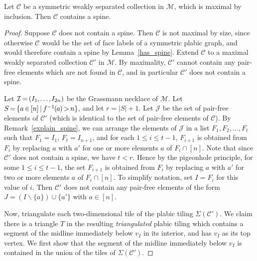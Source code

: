 \documentclass[ALCO,ThmDefs,Unicode,epreuves]{cedram}
\newcommand*{\mk}{\mkern -1mu}
\newcommand*{\Mk}{\mkern -2mu}
\begin{document}
\begin{lemm}\label{spine}Let $\mathcal{C}$ be a symmetric weakly separated collection in $\mathcal{M}$, which is maximal by inclusion. Then $\mathcal{C}$ contains a spine.
\end{lemm}

\begin{proof}
Suppose $\mathcal{C}$ does not contain a spine. Then $\mathcal{C}$ is not maximal by size, since otherwise $\mathcal{C}$ would be the set of face labels of a symmetric plabic graph, and would therefore contain a spine by Lemma~\ref{has_spine}. Extend $\mathcal{C}$ to a maximal weakly separated collection $\mathcal{C}'$ in $\mathcal{M}$. By maximality, $\mathcal{C}'$ cannot contain any pair-free elements which are not found in $\mathcal{C}$, and in particular $\mathcal{C}'$ does not contain a spine. 

Let $\mathcal{I} \Mk =\Mk  (I_1\mk,\mk\ldots\mk,\mk I_{2n})$ be the Grassmann necklace of $\mathcal{M}$. Let 
\hbox{$S \Mk =\Mk  \{a \Mk \in \Mk [n] \Mk \mid \Mk f^{-1}\mk(\mk a\mk ) \Mk >\Mk  n\}\mk$,} and let $r = |S| + 1$. Let $\mathcal{J}$ be the set of pair-free elements of $\mathcal{C}'$ (which is identical to the set of pair-free elements of $\mathcal{C}$). By Remark~\ref{explain_spine}, we can arrange the elements of $\mathcal{J}$ in a list $F_1,F_2,\ldots,F_t$ such that $F_1 = I_1$, $F_t = I_{n+1}$, and for each $1 \leq i \leq t-1$, $F_{i+1}$ is obtained from $F_i$ by replacing $a$ with $a'$ for one or more elements $a$ of $F_i \cap [n]$. Note that since $\mathcal{C}'$ does not contain a spine, we have $t < r$. Hence by the pigeonhole principle, for some $1 \leq i \leq t-1$, the set $F_{i+1}$ is obtained from $F_i$ by replacing $a$ with $a'$ for two or more elements $a$ of $F_i \cap [n]$. To simplify notation, set $I = F_i$ for this value of $i$. Then $\mathcal{C}'$ does not contain any pair-free elements of the form $J = (I \backslash \{a\}) \cup \{a'\}$ with $a \in [n]$. 

Now, triangulate each two-dimensional tile of the plabic tiling $\Sigma(\mathcal{C}')$. 
We claim there is a triangle $T$ in the resulting \emph{triangulated} plabic tiling which contains a segment of the midline immediately below $v_I$ in its interior, and has $v_I$ as its top vertex. We first show that the segment of the midline immediately below $v_{I}$ is contained in the union of the tiles of $\Sigma(\mathcal{C}')$.


\end{proof}
\end{document}

